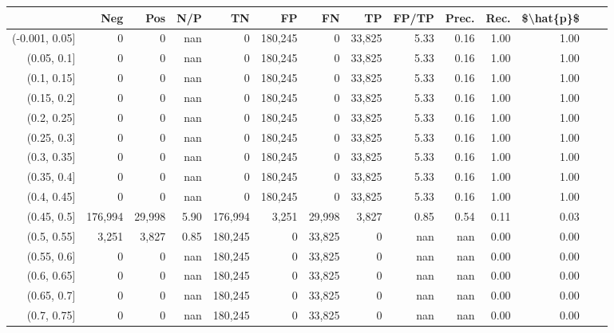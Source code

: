 \begin{tabular}{rrrrrrrrrrrrrr}
\toprule
{} &      Neg &     Pos &   N/P &       TN &       FP &      FN &      TP & FP/TP & Prec. &  Rec. & \$\textbackslash hat\{p\}\$ \\
\midrule
(-0.001, 0.05] &        0 &       0 &   nan &        0 &  180,245 &       0 &  33,825 &  5.33 &  0.16 &  1.00 &      1.00 \\
(0.05, 0.1]    &        0 &       0 &   nan &        0 &  180,245 &       0 &  33,825 &  5.33 &  0.16 &  1.00 &      1.00 \\
(0.1, 0.15]    &        0 &       0 &   nan &        0 &  180,245 &       0 &  33,825 &  5.33 &  0.16 &  1.00 &      1.00 \\
(0.15, 0.2]    &        0 &       0 &   nan &        0 &  180,245 &       0 &  33,825 &  5.33 &  0.16 &  1.00 &      1.00 \\
(0.2, 0.25]    &        0 &       0 &   nan &        0 &  180,245 &       0 &  33,825 &  5.33 &  0.16 &  1.00 &      1.00 \\
(0.25, 0.3]    &        0 &       0 &   nan &        0 &  180,245 &       0 &  33,825 &  5.33 &  0.16 &  1.00 &      1.00 \\
(0.3, 0.35]    &        0 &       0 &   nan &        0 &  180,245 &       0 &  33,825 &  5.33 &  0.16 &  1.00 &      1.00 \\
(0.35, 0.4]    &        0 &       0 &   nan &        0 &  180,245 &       0 &  33,825 &  5.33 &  0.16 &  1.00 &      1.00 \\
(0.4, 0.45]    &        0 &       0 &   nan &        0 &  180,245 &       0 &  33,825 &  5.33 &  0.16 &  1.00 &      1.00 \\
(0.45, 0.5]    &  176,994 &  29,998 &  5.90 &  176,994 &    3,251 &  29,998 &   3,827 &  0.85 &  0.54 &  0.11 &      0.03 \\
(0.5, 0.55]    &    3,251 &   3,827 &  0.85 &  180,245 &        0 &  33,825 &       0 &   nan &   nan &  0.00 &      0.00 \\
(0.55, 0.6]    &        0 &       0 &   nan &  180,245 &        0 &  33,825 &       0 &   nan &   nan &  0.00 &      0.00 \\
(0.6, 0.65]    &        0 &       0 &   nan &  180,245 &        0 &  33,825 &       0 &   nan &   nan &  0.00 &      0.00 \\
(0.65, 0.7]    &        0 &       0 &   nan &  180,245 &        0 &  33,825 &       0 &   nan &   nan &  0.00 &      0.00 \\
(0.7, 0.75]    &        0 &       0 &   nan &  180,245 &        0 &  33,825 &       0 &   nan &   nan &  0.00 &      0.00 \\

\end{tabular}
